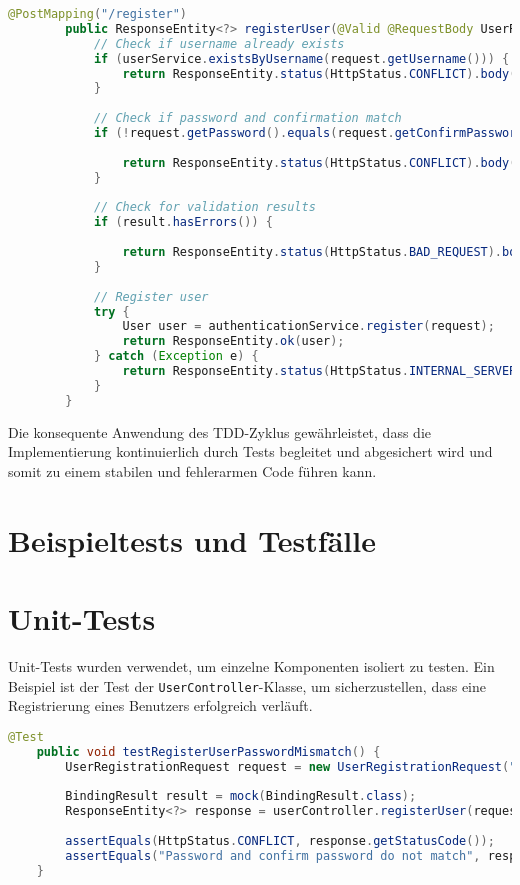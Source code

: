 \begin{enumerate}
	\begin{lstlisting}[language=Java]
		@PostMapping("/register")
		public ResponseEntity<?> registerUser(@Valid @RequestBody UserRegistrationRequest request, BindingResult result) {
			// Check if username already exists
			if (userService.existsByUsername(request.getUsername())) {
				return ResponseEntity.status(HttpStatus.CONFLICT).body("Username already exists");
			}
			
			// Check if password and confirmation match
			if (!request.getPassword().equals(request.getConfirmPassword())) {
				
				return ResponseEntity.status(HttpStatus.CONFLICT).body("Password and confirm password do not match");
			}
			
			// Check for validation results
			if (result.hasErrors()) {
				
				return ResponseEntity.status(HttpStatus.BAD_REQUEST).body("Validation error: " + result.getAllErrors());
			}
			
			// Register user
			try {
				User user = authenticationService.register(request);
				return ResponseEntity.ok(user);
			} catch (Exception e) {
				return ResponseEntity.status(HttpStatus.INTERNAL_SERVER_ERROR).body("Error registering user");
			}
		}
	\end{lstlisting}
	
\end{enumerate}

Die konsequente Anwendung des TDD-Zyklus gewährleistet, dass die Implementierung kontinuierlich durch Tests begleitet und abgesichert wird und somit zu einem stabilen und fehlerarmen Code führen kann.

\section{Beispieltests und Testfälle}

\section{Unit-Tests}

Unit-Tests wurden verwendet, um einzelne Komponenten isoliert zu testen. Ein Beispiel ist der Test der \texttt{UserController}-Klasse, um sicherzustellen, dass eine Registrierung eines Benutzers erfolgreich verläuft.

\begin{lstlisting}[language=Java]
	@Test
	public void testRegisterUserPasswordMismatch() {
		UserRegistrationRequest request = new UserRegistrationRequest("testuser", "password1", "password2");
		
		BindingResult result = mock(BindingResult.class);
		ResponseEntity<?> response = userController.registerUser(request, result);
		
		assertEquals(HttpStatus.CONFLICT, response.getStatusCode());
		assertEquals("Password and confirm password do not match", response.getBody());
	}
\end{lstlisting}

